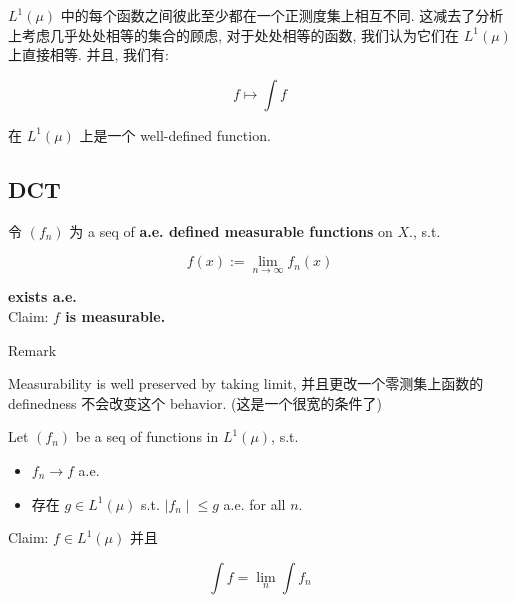\(L^{1}(\mu)\) 中的每个函数之间彼此至少都在一个正测度集上相互不同. 这减去了分析上考虑几乎处处相等的集合的顾虑, 对于处处相等的函数, 我们认为它们在 \(L^{1}(\mu)\) 上直接相等. 并且, 我们有:

\[f\mapsto\int f\]

在 \(L^{1}(\mu)\) 上是一个 well-defined function.

\subsection{DCT}\label{dct}

\begin{lemma}

令 \((f_{n})\) 为 a seq of \textbf{a.e. defined measurable functions} on \(X\)., s.t.

\[f(x) := \lim\limits_{n\rightarrow\infty}f_{n}(x)\]

\textbf{exists a.e.}\\
Claim: \textbf{\(f\) is measurable.}

\end{lemma}

\begin{qlremark}{Remark}

Measurability is well preserved by taking limit, 并且更改一个零测集上函数的 definedness 不会改变这个 behavior. (这是一个很宽的条件了)

\end{qlremark}

\begin{theorem}{}

Let \((f_{n})\) be a seq of functions in \(L^{1}(\mu)\), s.t.

\begin{itemize}
\item
  \(f_{n}\rightarrow f\) a.e.
\item
  存在 \(g \in L^{1}(\mu)\) s.t. \(\left. |f_{n} \middle| \leq g \right.\) a.e. for all \(n\).
\end{itemize}

Claim: \(f \in L^{1}(\mu)\) 并且

\[\int f = \lim\limits_{n}\int f_{n}\]

\end{theorem}

